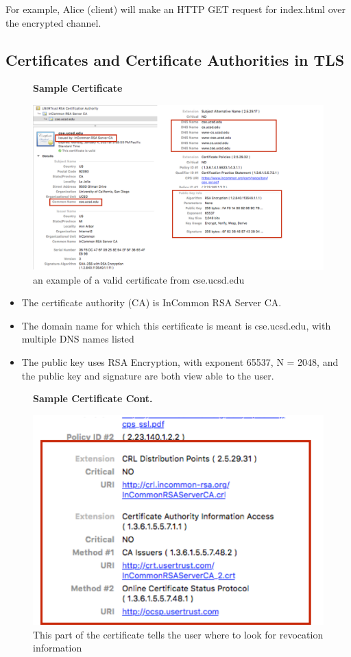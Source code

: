 \documentclass[11pt]{article} %
\begin{document}
\noindent For example, Alice (client) will make an HTTP GET request for index.html over 
the encrypted channel.

\newpage
\subsection{Certificates and Certificate Authorities in TLS}
\begin{figure}[H]
    \centering
    \textbf{Sample Certificate}\par\medskip
    \includegraphics[scale=.4]{./cert1.png}
    \caption{an example of a valid certificate from cse.ucsd.edu}
\end{figure}
\begin{itemize}
      \item  The certificate authority (CA) is InCommon RSA Server CA.
      \item The domain name for which this certificate is meant is cse.ucsd.edu, with multiple DNS names listed
      \item The public key uses RSA Encryption, with exponent 65537, N = 2048, and the public key and signature are both view able to the user.
\end{itemize}
\newpage

\begin{figure}[H]
    \centering
    \textbf{Sample Certificate Cont.}\par\medskip
    \includegraphics[scale=.5]{./cert2.png}
    \caption{This part of the certificate tells the user where to look for revocation information}
\end{figure}
\end{document}
